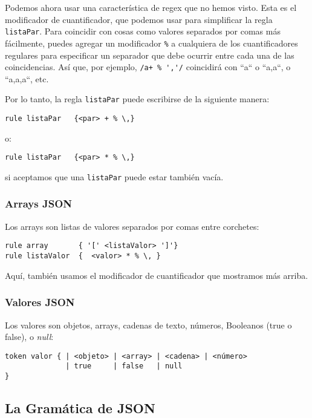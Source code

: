 Podemos ahora usar una característica de regex que no hemos
visto. Esta es el modificador de cuantificador, que podemos
usar para simplificar la regla {\tt listaPar}. Para coincidir
con cosas como valores separados por comas más fácilmente, 
puedes agregar un modificador \verb|%| a cualquiera de los
cuantificadores regulares para especificar un separador
que debe ocurrir entre cada una de las coincidencias. Así 
que, por ejemplo, \verb|/a+ % ','/| coincidirá con ``a`` o ``a,a``,
o ``a,a,a``, etc.


Por lo tanto, la regla {\tt listaPar} puede escribirse de la 
siguiente manera:

\begin{verbatim}
rule listaPar   {<par> + % \,}
\end{verbatim}

o:

\begin{verbatim}
rule listaPar   {<par> * % \,}
\end{verbatim}

si aceptamos que una {\tt listaPar} puede estar también vacía.

\subsubsection{Arrays JSON}

Los arrays son listas de valores separados por comas entre corchetes:

\begin{verbatim}
rule array       { '[' <listaValor> ']'}
rule listaValor  {  <valor> * % \, }
\end{verbatim}

Aquí, también usamos el modificador de cuantificador 
que mostramos más arriba.

\subsubsection{Valores JSON}

Los valores son objetos, arrays, cadenas de texto, números,
Booleanos (true o false), o \emph{null}:

\begin{verbatim}
token valor { | <objeto> | <array> | <cadena> | <número> 
              | true     | false   | null 
}
\end{verbatim}

\subsection{La Gramática de JSON}

